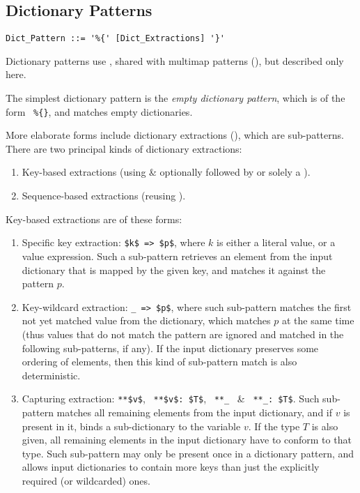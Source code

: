 \subsection{Dictionary Patterns}
\label{sec:dict-patterns}

\grammar\begin{lstlisting}
Dict_Pattern ::= '%{' [Dict_Extractions] '}'
\end{lstlisting}

Dictionary patterns use , shared with multimap patterns (), but described only here. 

The simplest dictionary pattern is the {\em empty dictionary pattern}, which is of the form ~\lstinline!%{}!, and matches empty dictionaries. 

More elaborate forms include dictionary extractions (), which are sub-patterns. There are two principal kinds of dictionary extractions:
\begin{enumerate}
  \item Key-based extractions (using  \& optionally followed by or solely a ). 
  \item Sequence-based extractions (reusing ). 
\end{enumerate}

Key-based extractions are of these forms:
\begin{enumerate}
  \item Specific key extraction: \lstinline!$k$ => $p$!, where $k$ is either a literal value, or a value expression. Such a sub-pattern retrieves an element from the input dictionary that is mapped by the given key, and matches it against the pattern $p$. 
  \item Key-wildcard extraction: \lstinline!_ => $p$!, where such sub-pattern matches the first not yet matched value from the dictionary, which matches $p$ at the same time (thus values that do not match the pattern are ignored and matched in the following sub-patterns, if any). If the input dictionary preserves some ordering of elements, then this kind of sub-pattern match is also deterministic. 
  \item Capturing extraction: \lstinline!**$v$!, ~\lstinline!**$v$: $T$!, ~\lstinline!**_!~ \& ~\lstinline!**_: $T$!. Such sub-pattern matches all remaining elements from the input dictionary, and if $v$ is present in it, binds a sub-dictionary to the variable $v$. If the type $T$ is also given, all remaining elements in the input dictionary have to conform to that type. Such sub-pattern may only be present once in a dictionary pattern, and allows input dictionaries to contain more keys than just the explicitly required (or wildcarded) ones. 
\end{enumerate}

